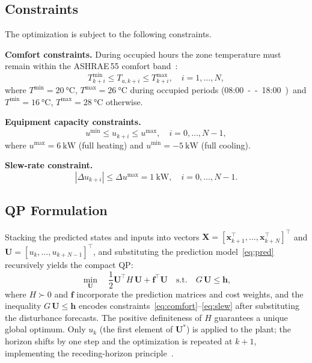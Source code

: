 \documentclass[conference,a4paper]{IEEEtran}[2015/08/26]
\newcommand{\vek}[1]{\bm{#1}}
\begin{document}
\subsection{Constraints}

The optimization is subject to the following constraints.

\textbf{Comfort constraints.} During occupied hours the zone temperature
must remain within the ASHRAE\,55 comfort band~\cite{ASHRAE55}:
\begin{equation}
  T^{\min}_{k+i} \le T_{a,k+i} \le T^{\max}_{k+i},
  \quad i = 1, \ldots, N,
  \label{eq:comfort}
\end{equation}
where $T^{\min} = \SI{20}{\celsius}$, $T^{\max} = \SI{26}{\celsius}$
during occupied periods (\SI{08:00}--\SI{18:00}) and
$T^{\min} = \SI{16}{\celsius}$, $T^{\max} = \SI{28}{\celsius}$ otherwise.

\textbf{Equipment capacity constraints.}
\begin{equation}
  u^{\min} \le u_{k+i} \le u^{\max},
  \quad i = 0, \ldots, N-1,
  \label{eq:cap}
\end{equation}
where $u^{\max} = \SI{6}{\kilo\watt}$ (full heating) and
$u^{\min} = -\SI{5}{\kilo\watt}$ (full cooling).

\textbf{Slew-rate constraint.}
\begin{equation}
  |\Delta u_{k+i}| \le \Delta u^{\max} = \SI{1}{\kilo\watt},
  \quad i = 0, \ldots, N-1.
  \label{eq:slew}
\end{equation}

\subsection{QP Formulation}

Stacking the predicted states and inputs into vectors
$\vek{X} = [\vek{x}_{k+1}^\top, \ldots, \vek{x}_{k+N}^\top]^\top$ and
$\vek{U} = [u_k, \ldots, u_{k+N-1}]^\top$, and substituting the
prediction model~\eqref{eq:pred} recursively yields the compact QP:
\begin{equation}
  \min_{\vek{U}}\quad \frac{1}{2}\vek{U}^\top H\,\vek{U} + \vek{f}^\top \vek{U}
  \quad \text{s.t.} \quad G\,\vek{U} \le \vek{h},
  \label{eq:qp}
\end{equation}
where $H \succ 0$ and $\vek{f}$ incorporate the prediction matrices and
cost weights, and the inequality $G\,\vek{U} \le \vek{h}$ encodes
constraints~\eqref{eq:comfort}--\eqref{eq:slew} after substituting the
disturbance forecasts. The positive definiteness of $H$ guarantees a
unique global optimum. Only $u_k$ (the first element of $\vek{U}^*$)
is applied to the plant; the horizon shifts by one step and the
optimization is repeated at $k+1$, implementing the receding-horizon
principle~\cite{Rawlings2017}.
\end{document}
